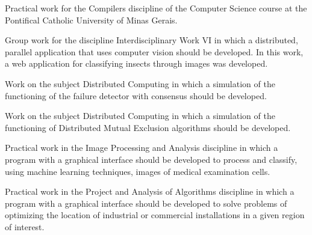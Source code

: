 
Practical work for the Compilers discipline of the Computer Science course at the Pontifical Catholic University of Minas Gerais.\\
\divider

Group work for the discipline Interdisciplinary Work VI in which a distributed, parallel application that uses computer vision should be developed. In this work, a web application for classifying insects through images was developed.\\
\divider

Work on the subject Distributed Computing in which a simulation of the functioning of the failure detector with consensus should be developed.\\
\divider

Work on the subject Distributed Computing in which a simulation of the functioning of Distributed Mutual Exclusion algorithms should be developed.\\
\divider

Practical work in the Image Processing and Analysis discipline in which a program with a graphical interface should be developed to process and classify, using machine learning techniques, images of medical examination cells.\\
\divider

Practical work in the Project and Analysis of Algorithms discipline in which a program with a graphical interface should be developed to solve problems of optimizing the location of industrial or commercial installations in a given region of interest.\\
\divider

